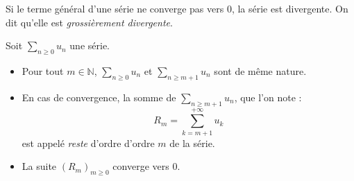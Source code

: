 \documentclass[french,11pt,twoside]{VcCours}
\newcommand{\Sum}[2]{\ensuremath{\textstyle{\sum\limits_{#1}^{#2}}}}
\begin{document}
\begin{cor}
Si le terme général d'une série ne converge pas vers $0$, la série est divergente. On dit qu'elle est \textit{grossièrement divergente}.
\end{cor}

%

\begin{defip}
Soit $\Sum{n\geq 0}{} u_n$ une série.
\begin{itemize}
\item Pour tout $m \in \mathbb{N}$, $\Sum{n\geq 0}{}u_n$ et $\Sum{n\geq m+1}{}u_n$ sont de même nature.
\item En cas de convergence, la somme de $\Sum{n\geq m+1}{}u_n$, que l'on note :
$$ R_m = \sum_{k= m+1}^{+\infty}u_k$$
est appelé \textit{reste} d'ordre d'ordre $m$ de la série. 
\item La suite $(R_m)_{m \geq 0}$ converge vers $0$.
\end{itemize}
\end{defip}
%
\begin{preuve}

\vspace{6cm}
%
\end{preuve}
%
\end{document}

